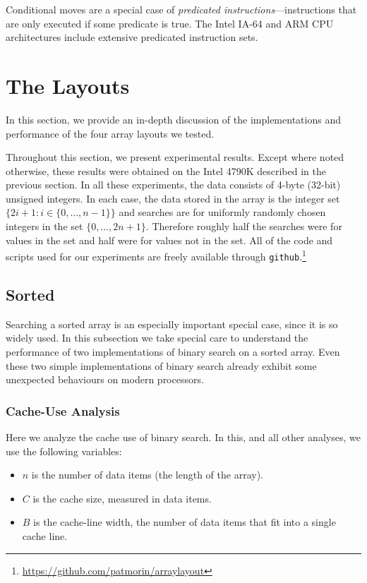 \documentclass{patmorin}
\begin{document}
Conditional moves are a special case of \emph{predicated
instructions}---instructions that are only executed if some predicate
is true.  The Intel IA-64 and ARM CPU architectures include extensive
predicated instruction sets.

\section{The Layouts}

In this section, we provide an in-depth discussion of the implementations
and performance of the four array layouts we tested.

Throughout this section, we present experimental results. Except where
noted otherwise, these results were obtained on the Intel 4790K described
in the previous section.  In all these experiments, the data consists of
4-byte (32-bit) unsigned integers. In each case, the data stored in the
array is the integer set $\{2i+1: i\in\{0,\ldots,n-1\}\}$ and searches are
for uniformly randomly chosen integers in the set $\{0,\ldots,2n+1\}$.
Therefore roughly half the searches were for values in the set and half
were for values not in the set.
All of the code and scripts used for our
experiments are freely available through
\texttt{github}.\footnote{\url{https://github.com/patmorin/arraylayout}}

\subsection{Sorted}

Searching a sorted array is an especially important special case, since it
is so widely used. In this subsection we take special care to understand
the performance of two implementations of binary search on a sorted array.
Even these two simple implementations of binary search already exhibit
some unexpected behaviours on modern processors.

\subsubsection{Cache-Use Analysis}

Here we analyze the cache use of binary search. In this, and all other
analyses, we use the following variables:

\begin{itemize}
  \item $n$ is the number of data items (the length of the array).
  \item $C$ is the cache size, measured in data items.
  \item $B$ is the cache-line width, the number of data items that fit
        into a single cache line.
\end{itemize}
\end{document}

